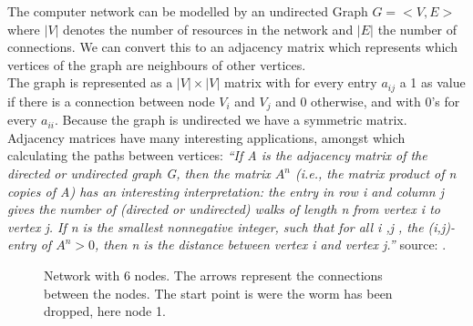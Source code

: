 
The computer network can be modelled by an undirected Graph $G = < V, E> $ where $|V|$ denotes the number of resources in the network and $|E|$ the number of connections. We can convert this to an adjacency matrix which represents which vertices of the graph are neighbours of other vertices. \\
The graph is represented as a $|V| \times |V|$ matrix with for every entry $a_{ij}$ a 1 as value if there is a connection between node $V_{i}$ and $V_{j}$ and 0 otherwise, and with 0's for every $a_{ii}$. Because the graph is undirected we have a symmetric matrix.  \\ 

Adjacency matrices have many interesting applications, amongst which calculating the paths between vertices:
\textit{``If \textit{A} is the adjacency matrix of the directed or undirected graph \textit{G}, then the matrix $A^{n}$ (i.e., the matrix product of \textit{n} copies of \textit{A}) has an interesting interpretation: the entry in row \textit{i} and column \textit{j} gives the number of (directed or undirected) walks of length \textit{n} from vertex \textit{i} to vertex \textit{j}. If \textit{n} is the smallest nonnegative integer, such that for all i ,j , the (i,j)-entry of $A^{n} > 0$, then n is the distance between vertex i and vertex \textit{j}.''}  source: \cite{wikimatrix} .\\


\begin{figure}
\centering
{}
\caption{Network with 6 nodes. The arrows represent the connections between the nodes. The start point is were the worm has been dropped, here node 1.}
\label{netwerkfiguur}
\end{figure}

